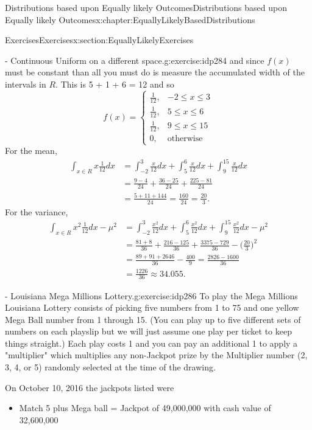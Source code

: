 \documentclass[oneside,10pt,]{book}
\numberwithin{equation}{section}
\begin{document}
\begin{chapterptx}{Distributions based upon Equally likely Outcomes}{}{Distributions based upon Equally likely Outcomes}{}{}{x:chapter:EquallyLikelyBasedDistributions}
\begin{sectionptx}{Exercises}{}{Exercises}{}{}{x:section:EquallyLikelyExercises}
\begin{inlineexercise}{- Continuous Uniform on a different space.}{g:exercise:idp284}
and since \(f(x)\) must be constant than all you must do is measure the accumulated width of the intervals in \(R\). This is 5 + 1 + 6 = 12 and so%
\begin{equation*}
f(x)=\left\{\begin{matrix}
\frac{1}{12}, & -2 \le x \le 3
\\ \frac{1}{12}, & 5 \le x \le 6
\\ \frac{1}{12}, & 9 \le x \le 15
\\ 0, & \text{otherwise}
\end{matrix}\right.
\end{equation*}
For the mean,%
\begin{align*}
\int_{x \in R} x \frac{1}{12} dx & = \int_{-2}^3 \frac{x}{12} dx + \int_5^6 \frac{x}{12} dx + \int_9^{15} \frac{x}{12} dx\\
& = \frac{9-4}{24} + \frac{36-25}{24} + \frac{225-81}{24}\\
& = \frac{5+11+144}{24} = \frac{160}{24} = \frac{20}{3}.
\end{align*}
For the variance,%
\begin{align*}
\int_{x \in R} x^2 \frac{1}{12} dx - \mu^2 & = \int_{-2}^3 \frac{x^2}{12} dx + \int_5^6 \frac{x^2}{12} dx + \int_9^{15} \frac{x^2}{12} dx - \mu^2\\
& = \frac{81+8}{36} + \frac{216-125}{36} + \frac{3375-729}{36} - \big ( \frac{20}{3} \big )^2\\
& = \frac{89+91+2646}{36} - \frac{400}{9} = \frac{2826-1600}{36} \\
& = \frac{1226}{36} \approx	34.055.
\end{align*}
%
\end{inlineexercise}%
\begin{inlineexercise}{- Louisiana Mega Millions Lottery.}{g:exercise:idp286}%
To play the Mega Millions Louisiana Lottery consists of picking five numbers from 1 to 75 and one yellow Mega Ball number from 1 through 15. (You can play up to five different sets of numbers on each playslip but we will just assume one play per ticket to keep things straight.) Each play costs \textdollar{}1 and you can pay an additional \textdollar{}1 to apply a "multiplier" which multiplies any non-Jackpot prize by the Multiplier number (2, 3, 4, or 5) randomly selected at the time of the drawing.%
\par
On October 10, 2016 the jackpots listed were%
\begin{itemize}[label=\textbullet]
\item{}Match 5 plus Mega ball = Jackpot of \textdollar{}49,000,000 with cash value of \textdollar{}32,600,000%

\end{itemize}
\end{inlineexercise}
\end{sectionptx}
\end{chapterptx}
\end{document}
